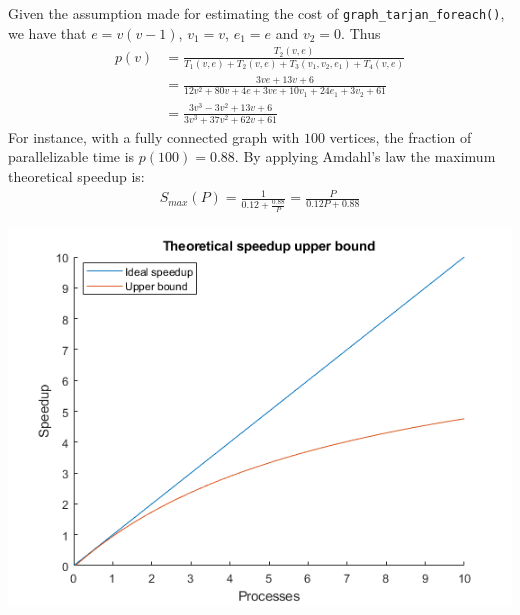 \noindent Given the assumption made for estimating the cost of \verb|graph_tarjan_foreach()|, we have that $e=v(v-1)$, $v_1=v$, $e_1=e$ and $v_2=0$. Thus
\begin{align*}
  p(v) & =\frac{T_2(v,e)}{T_1(v,e)+T_2(v,e)+T_3(v_1,v_2,e_1)+T_4(v,e)} \\
       & =\frac{3ve+13v+6}{12v^2+80v+4e+3ve+10v_1+24e_1+3v_2+61} \\
       & =\frac{3v^3-3v^2+13v+6}{3v^3+37v^2+62v+61}
\end{align*}
For instance, with a fully connected graph with $100$ vertices, the fraction of parallelizable time is $p(100)=0.88$. By applying Amdahl's law the maximum theoretical speedup is:
\begin{align*}
  S_{max}(P)=\frac{1}{0.12+\frac{0.88}{P}}=\frac{P}{0.12P+0.88}
\end{align*}
\begin{center}
  \includegraphics[scale=1]{img/untitled.png}
\end{center}

